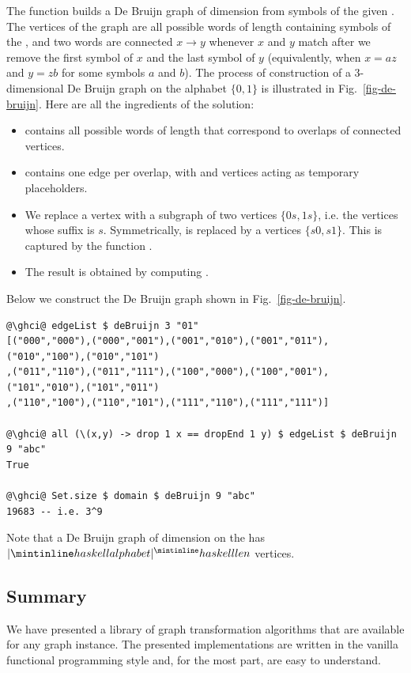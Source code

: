 The function builds a De Bruijn graph of dimension  from symbols of the given
. The vertices of the graph are all possible words of length 
containing symbols of the , and two words are connected $x \rightarrow y$
whenever $x$ and $y$ match after we remove the first symbol of $x$ and the last symbol
of $y$ (equivalently, when $x = az$ and $y = zb$ for some symbols $a$ and $b$).
The process of construction of a 3-dimensional De Bruijn graph on the alphabet
$\{0, 1\}$ is illustrated in Fig.~\ref{fig-de-bruijn}. Here are all the ingredients
of the solution:
\begin{itemize}
    \item {} contains all possible words of length  that
    correspond to overlaps of connected vertices.
    \item {} contains one edge per overlap, with  and
     vertices acting as temporary placeholders.
    \item We replace a vertex  with a subgraph of two vertices
    $\{0s, 1s\}$, i.e. the vertices whose suffix is $s$. Symmetrically,
     is replaced by a vertices $\{s0, s1\}$. This is captured
    by the function .
    \item The result is obtained by computing   .
\end{itemize}

Below we construct the De Bruijn graph shown in Fig.~\ref{fig-de-bruijn}.
\begin{verbatim}
@\ghci@ edgeList $ deBruijn 3 "01"
[("000","000"),("000","001"),("001","010"),("001","011"),("010","100"),("010","101")
,("011","110"),("011","111"),("100","000"),("100","001"),("101","010"),("101","011")
,("110","100"),("110","101"),("111","110"),("111","111")]

@\ghci@ all (\(x,y) -> drop 1 x == dropEnd 1 y) $ edgeList $ deBruijn 9 "abc"
True

@\ghci@ Set.size $ domain $ deBruijn 9 "abc"
19683 -- i.e. 3^9
\end{verbatim}

\noindent
Note that a De Bruijn graph of dimension  on the  has
$|\hs{alphabet}|^\hs{len}$ vertices.

\subsection{Summary}\label{sub-library-summary}

We have presented a library of graph transformation algorithms that are available
for any graph instance. The presented implementations are written in the vanilla
functional programming style and, for the most part, are easy to understand.
